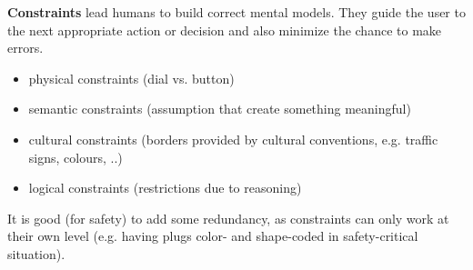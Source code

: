 \textbf{Constraints} lead humans to build correct mental models. They guide the user to the next appropriate action or decision and also minimize the chance to make errors.
\begin{itemize}
\item physical constraints (dial vs. button)
\item semantic constraints (assumption that create something meaningful)
\item cultural constraints (borders provided by cultural conventions, e.g. traffic signs, colours, ..)
\item logical constraints (restrictions due to reasoning)
\end{itemize}
It is good (for safety) to add some redundancy, as constraints can only work at their own level (e.g. having plugs color- and shape-coded in safety-critical situation).\\

